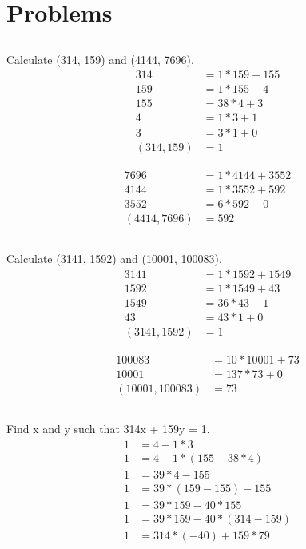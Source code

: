 \documentclass{article}
\begin{document}
\section{Problems}

\subsection{}
Calculate (314, 159) and (4144, 7696).
\begin{align}
  314 &= 1 * 159 + 155  \\
  159 &= 1 * 155 + 4 \\
  155 &= 38 * 4 + 3 \\
  4 &= 1 * 3 + 1 \\
  3 &= 3 * 1 + 0 \\
  (314, 159) &= 1
\end{align}

\begin{align}
  7696 &= 1 * 4144 + 3552 \\
  4144 &= 1 * 3552 + 592 \\
  3552 &= 6 * 592 + 0 \\
  (4414, 7696) &= 592
\end{align}

\subsection{}
Calculate (3141, 1592) and (10001, 100083).
\begin{align}
  3141 &= 1 * 1592 + 1549  \\
  1592 &= 1 * 1549 + 43 \\
  1549 &= 36 * 43 + 1 \\
  43 &= 43 * 1 + 0 \\
  (3141, 1592) &= 1
\end{align}

\begin{align}
  100083 &= 10 * 10001 + 73 \\
  10001 &= 137 * 73 + 0 \\
  (10001, 100083) &= 73
\end{align}

\subsection{}
Find x and y such that 314x + 159y = 1.
\begin{align}
  1 &= 4 - 1 * 3 \\
  1 &= 4 - 1 * (155 - 38 * 4) \\
  1 &= 39 * 4 - 155 \\
  1 &= 39 * (159 - 155) - 155 \\
  1 &= 39 * 159 - 40 * 155 \\
  1 &= 39 * 159 - 40 * (314 - 159) \\
  1 &= 314 * (-40) + 159 * 79
\end{align}
\end{document}
